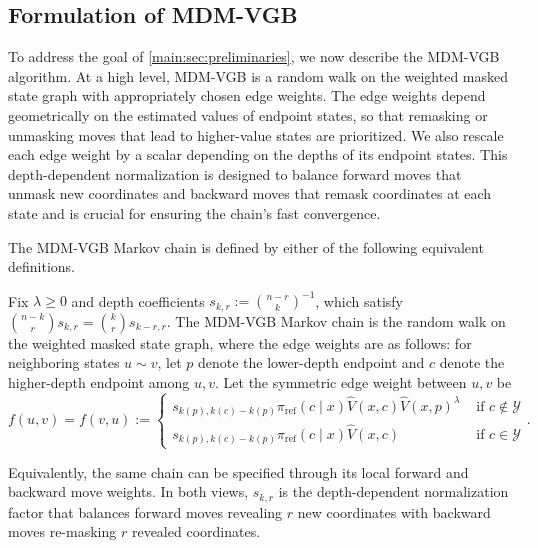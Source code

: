 \documentclass{article}
\numberwithin{theorem}{section}
\numberwithin{proposition}{section}
\numberwithin{corollary}{section}
\numberwithin{lemma}{section}
\numberwithin{conjecture}{section}
\numberwithin{remark}{section}
\numberwithin{definition}{section}
\numberwithin{assumption}{section}
\numberwithin{example}{section}
\newcommand{\calY}{{\mathcal{Y}}}
\providecommand{\base}{\pi_{\mathrm{ref}}}
\begin{document}
\subsection{Formulation of MDM-VGB} 
To address the goal of \cref{main:sec:preliminaries}, we now describe the MDM-VGB algorithm. At a high level, MDM-VGB is a random walk on the weighted masked state graph with appropriately chosen edge weights.
The edge weights depend geometrically on the estimated values of endpoint states, so that remasking or unmasking moves that lead to higher-value states are prioritized. We also rescale each edge weight by a scalar depending on the depths of
its endpoint states. This depth-dependent normalization is designed to balance forward moves that unmask new coordinates and backward moves that remask coordinates at each state and is crucial for ensuring the chain's fast convergence.

The MDM-VGB Markov chain is defined by either of the following equivalent definitions. 
\begin{definition}
\label{def:bg_aoar_edge_weights main}
Fix $\lambda\ge0$ and depth coefficients $s_{k,r}:=\binom{n-r}{k}^{-1}$, which satisfy $\binom{n-k}{r}s_{k,r} =    \binom{k}{r}s_{k-r,r}$.
The MDM-VGB Markov chain is the random walk on the weighted masked state graph, where the edge weights are as follows: for neighboring states $u \sim v$, let $p$ denote the lower-depth endpoint and $c$ denote the higher-depth endpoint among $u,v$. Let the symmetric edge weight between $u,v$ be 
\begin{equation*}
    f(u,v)=f(v,u):=\begin{cases}
    s_{k(p), k(c)-k(p)} \base(c\mid x) \widehat V(x,c)\widehat V(x,p)^\lambda  & \text{ if } c \notin\calY \\s_{k(p), k(c)-k(p)}\base(c\mid x)\widehat V(x,c) & \text{ if } c \in\calY  \end{cases}.
\end{equation*}

\end{definition}

Equivalently, the same chain can be specified through its local forward and backward move weights. In both views, \(s_{k,r}\) is the depth-dependent normalization factor that balances forward moves revealing \(r\) new coordinates with backward moves re-masking \(r\) revealed coordinates.
\end{document}
